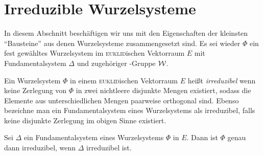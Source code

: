 \section{Irreduzible Wurzelsysteme}
\label{sec:irreduc}

In diesem Abschnitt beschäftigen wir uns mit den Eigenschaften der kleinsten ``Bausteine'' aus denen Wurzelsysteme zusammengesetzt sind.
Es sei wieder $\Phi$ ein fest gewähltes Wurzelsystem im \textsc{euklid}ischen Vektorraum $E$ mit Fundamentalsystem $\Delta$ und zugehöriger \weyl\hyp{}Gruppe $\mathcal{W}$.

\begin{defn}
  Ein Wurzelsystem $\Phi$ in einem \textsc{euklid}ischen Vektorraum $E$ heißt \emph{irreduzibel} wenn keine Zerlegung von $\Phi$ in zwei nichtleere disjunkte Mengen existiert, sodass die Elemente aus unterschiedlichen Mengen paarweise orthogonal sind.
  Ebenso bezeichne man ein Fundamentalsystem eines Wurzelsystems als irreduzibel, falls keine disjunkte Zerlegung im obigen Sinne existiert.
\end{defn}

\begin{lem}
  \label{lem:irreducibleRoot}
  Sei $\Delta$ ein Fundamentalsystem eines Wurzelsystems $\Phi$ in $E$.
  Dann ist $\Phi$ genau dann irreduzibel, wenn $\Delta$ irreduzibel ist.
\end{lem}

